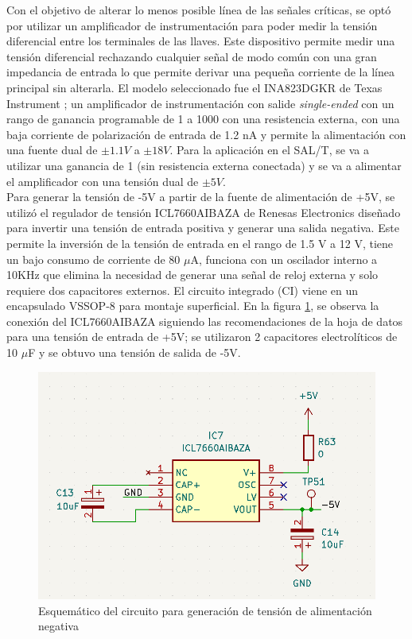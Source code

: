 Con el objetivo de alterar lo menos posible línea de las señales críticas, se optó por utilizar un amplificador de instrumentación para poder medir la tensión diferencial entre los terminales de las llaves. Este dispositivo permite medir una tensión diferencial rechazando cualquier señal de modo común con una gran impedancia de entrada lo que permite derivar una pequeña corriente de la línea principal sin alterarla. El modelo seleccionado fue el INA823DGKR de Texas Instrument \cite{INA823DGKR}; un amplificador de instrumentación con salide \textit{single-ended} con un rango de ganancia programable de 1 a 1000 con una resistencia externa, con una baja corriente de polarización de entrada de 1.2 nA y permite la alimentación con una fuente dual de $\pm1.1 V$ a $\pm18 V$. Para la aplicación en el SAL/T, se va a utilizar una ganancia de 1 (sin resistencia externa conectada) y se va a alimentar el amplificador con una tensión dual de $\pm5 V$.\\

Para generar la tensión de -5V a partir de la fuente de alimentación de +5V, se utilizó el regulador de tensión ICL7660AIBAZA de Renesas Electronics \cite{ICL7660AIBAZA} diseñado para invertir una tensión de entrada positiva y generar una salida negativa. Este permite la inversión de la tensión de entrada en el rango de 1.5 V a 12 V, tiene un bajo consumo de corriente de 80 $\mu$A, funciona con un oscilador interno a 10KHz que elimina la necesidad de generar una señal de reloj externa y solo requiere dos capacitores externos. El circuito integrado (CI) viene en un encapsulado VSSOP-8 para montaje superficial. En la figura \ref{fig:ICL7660AIBAZA}, se observa la conexión del ICL7660AIBAZA siguiendo las recomendaciones de la hoja de datos para una tensión de entrada de +5V; se utilizaron 2 capacitores electrolíticos de 10 $\mu$F y se obtuvo una tensión de salida de -5V. 

 
\begin{figure}[H]
    \centering
    \includegraphics[width = 0.8 \linewidth]{img/ICL7660AIBAZA.png}
    \caption{Esquemático del circuito para generación de tensión de alimentación negativa}
    \label{fig:ICL7660AIBAZA}
\end{figure}


